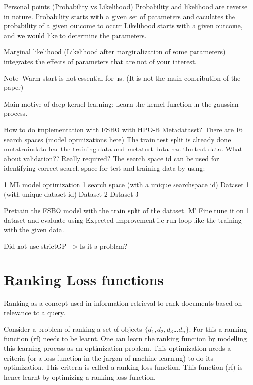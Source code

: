 \documentclass[11pt]{report}
\begin{document}
Personal points (Probability vs Likelihood)
    Probability and likelihood are reverse in nature.
    Probability starts with a given set of parameters and caculates the probability of a given outcome to occur
    Likelihood starts with a given outcome, and we would like to determine the parameters.

    Marginal likelihood (Likelihood after marginalization of some parameters)
        integrates the effects of parameters that are not of your interest.

Note:
    Warm start is not essential for us. (It is not the main contribution of the paper)

Main motive of deep kernel learning:
    Learn the kernel function in the gaussian process.

How to do implementation with FSBO with HPO-B Metadataset?
There are 16 search spaces (model optmizations here)
    The train test split is already done metatraindata has the training data and metatest data has the test data.
    What about validation?? Really required?
    The search space id can be used for identifying correct search space for test and training data by using:

1 ML model optimization
    1 search space (with a unique searchspace id)
        Dataset 1 (with unique dataset id)
        Dataset 2
        Dataset 3

Pretrain the FSBO model with the train split of the dataset. M'
Fine tune it on 1 dataset and evaluate using Expected Improvement
    i.e run loop like the training with the given data.

Did not use strictGP --> Is it a problem?
\fi

\section{Ranking Loss functions}

Ranking as a concept used in information retrieval to rank documents based on relevance to a query.

Consider a problem of ranking a set of objects $\{d_1, d_2, d_3 ... d_n\}$.
For this a ranking function (rf) needs to be learnt.
One can learn the ranking function by modelling this learning process as an optimization problem.
This optimization needs a criteria (or a loss function in the jargon of machine learning) to do its optimization.
This criteria is called a ranking loss function.
This function (rf) is hence learnt by optimizing a ranking loss function.
\end{document}
